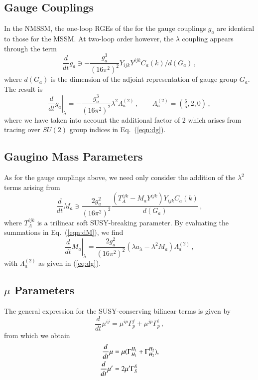 \documentclass[final,3p,times]{elsarticle}
\newcommand{\lamsq}{\lambda^2}
\newcommand{\dt}{\frac{d}{dt}}
\begin{document}
\subsection{Gauge Couplings}
In the NMSSM, the one-loop RGEs of the for the gauge couplings $g_a$ are 
identical to those for the MSSM.  At two-loop order however, the $\lambda$ 
coupling appears through the term
%
\begin{equation}
\dt g_a \ni - \frac{g_a^3}{(16\pi^2)^2} Y_{ijk}Y^{ijk} C_a(k)/d(G_a)\,,  
\label{eqn:dg}
\end{equation}
%
where $d(G_a)$ is the dimension of the adjoint representation of gauge group 
$G_a$.  The result is
%
\begin{equation}
\left. \dt g_a\right|_\lambda = -\frac{g_a^3}{(16\pi^2)^2}\lamsq \Lambda_a^{(2)}\,,
\qquad \Lambda_a^{(2)} = (\tfrac{6}{5},2,0)\,,
\label{eq:dg}
\end{equation}
%
where we have taken into account the additional factor of 2 which arises from 
tracing over $SU(2)$ group indices in Eq.~(\ref{eqn:dg}).

\subsection{Gaugino Mass Parameters}
As for the gauge couplings above, we need only consider the addition of the 
$\lambda^2$ terms arising from
%
\begin{equation}
\dt M_a \ni \frac{2g_a^2}{(16\pi^2)^2} 
\frac{(T_A^{ijk} - M_a Y^{ijk}) Y_{ijk}C_a(k)}{d(G_a)}\,,
\label{eqn:dM}
\end{equation}
%
where $T_A^{ijk}$ is a trilinear soft SUSY-breaking parameter. By evaluating the summations in Eq.~(\ref{eqn:dM}), we find
%
\begin{equation}
\left. \dt M_a\right|_{\lambda} = \frac{2g_a^2}{(16\pi^2)^2} (\lambda a_\lambda - \lambda^2 M_a)\Lambda^{(2)}_a\,,
\end{equation}
%
with $\Lambda_a^{(2)}$ as given in (\ref{eq:dg}).

\subsection{$\mu$ Parameters}
The general expression \cite{MV94,Yam94} for the SUSY-conserving bilinear terms is given by  
%
\begin{equation}
\dt \mu^{ij} = \mu^{ip}\Gamma_p^j + \mu^{jp}\Gamma_p^i\,,
\end{equation}
%
from which we obtain
%
\begin{align}
\dt\mu &= \mu (\Gamma_{H_1}^{H_1} + \Gamma_{H_2}^{H_2}), \notag \\
%
\dt\mu' &= 2\mu' \Gamma_S^S
\end{align}
%
\end{document}
